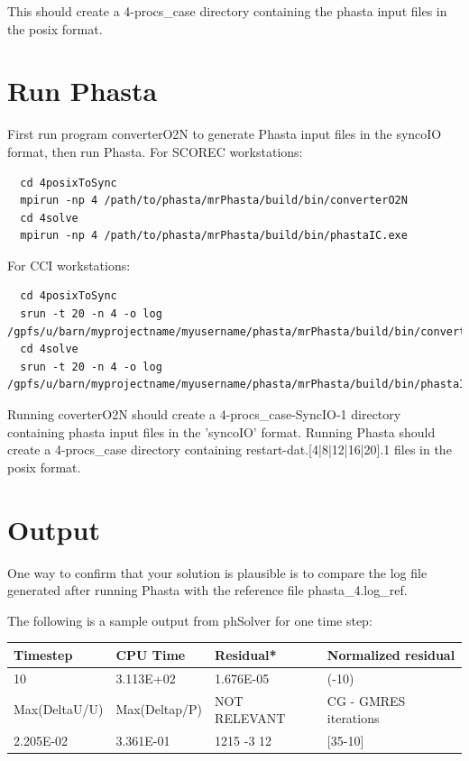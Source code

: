 \documentclass{article}
\begin{document}
This should create a 4-procs\_case directory containing the phasta input files in the posix format.

\section{Run Phasta}

First run program converterO2N to generate Phasta input files in the syncoIO format, then run Phasta. For SCOREC workstations: 
  \begin{lstlisting}
  cd 4posixToSync
  mpirun -np 4 /path/to/phasta/mrPhasta/build/bin/converterO2N 
  cd 4solve
  mpirun -np 4 /path/to/phasta/mrPhasta/build/bin/phastaIC.exe 
  \end{lstlisting}
For CCI workstations:
  \begin{lstlisting}
  cd 4posixToSync
  srun -t 20 -n 4 -o log /gpfs/u/barn/myprojectname/myusername/phasta/mrPhasta/build/bin/converterO2N
  cd 4solve
  srun -t 20 -n 4 -o log /gpfs/u/barn/myprojectname/myusername/phasta/mrPhasta/build/bin/phastaIC.exe
  \end{lstlisting}
Running coverterO2N should create a 4-procs\_case-SyncIO-1 directory containing phasta input files in the 'syncoIO' format.
Running Phasta should create a 4-procs\_case directory containing restart-dat.[4|8|12|16|20].1 files in the posix format.

\section{Output}

One way to confirm that your solution is plausible is to compare the log file generated after running Phasta with the reference file phasta\_4.log\_ref.

The following is a sample output from phSolver for one time step:
\begin{center}
    \begin{tabular}{| l | l | l | l |}
    \hline
    Timestep & CPU Time & Residual* & Normalized residual \\ \hline
    10 & 3.113E+02 & 1.676E-05 & (-10) \\ \hline
       Max(DeltaU/U) & Max(Deltap/P) & NOT RELEVANT& CG - GMRES iterations\\ \hline
      2.205E-02 & 3.361E-01 & 1215 -3 12  & [35-10] \\
    \hline

    \end{tabular}
\end{center}
\end{document}
